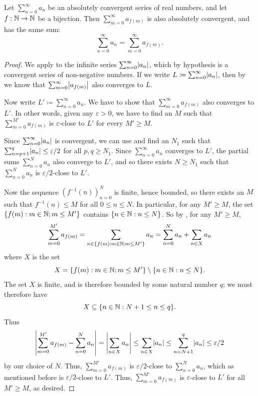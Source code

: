 \setcounter{thm}{2}
\begin{prop}\label{i:7.4.3}
  Let \(\sum_{n = 0}^\infty a_n\) be an absolutely convergent series of real numbers, and let \(f : \mathbb{N} \to \mathbb{N}\) be a bijection.
  Then \(\sum_{m = 0}^\infty a_{f(m)}\) is also absolutely convergent, and has the same sum:
  \[
    \sum_{n = 0}^\infty a_n = \sum_{m = 0}^\infty a_{f(m)}.
  \]
\end{prop}

\begin{proof}
  We apply  to the infinite series \(\sum_{n = 0}^\infty \abs{a_n}\), which by hypothesis is a convergent series of non-negative numbers.
  If we write \(L \coloneqq \sum_{n = 0}^\infty \abs{a_n}\), then by  we know that \(\sum_{m = 0}^\infty \abs{a_{f(m)}}\) also converges to \(L\).

  Now write \(L' \coloneqq \sum_{n = 0}^\infty a_n\).
  We have to show that \(\sum_{m = 0}^\infty a_{f(m)}\) also converges to \(L'\).
  In other words, given any \(\varepsilon > 0\), we have to find an \(M\) such that \(\sum_{m = 0}^{M'} a_{f(m)}\) is \(\varepsilon\)-close to \(L'\) for every \(M' \geq M\).

  Since \(\sum_{n = 0}^\infty \abs{a_n}\) is convergent, we can use  and find an \(N_1\) such that \(\sum_{n = p + 1}^q \abs{a_n} \leq \varepsilon / 2\) for all \(p, q \geq N_1\).
  Since \(\sum_{n = 0}^\infty a_n\) converges to \(L'\), the partial sums \(\sum_{n = 0}^N a_n\) also converge to \(L'\), and so there exists \(N \geq N_1\) such that \(\sum_{n = 0}^N a_n\) is \(\varepsilon / 2\)-close to \(L'\).

  Now the sequence \((f^{-1}(n))_{n = 0}^N\) is finite, hence bounded, so there exists an \(M\) such that \(f^{-1}(n) \leq M\) for all \(0 \leq n \leq N\).
  In particular, for any \(M' \geq M\), the set \(\left\lbrace f(m) : m \in \mathbb{N}; m \leq M'\right\rbrace\) contains \(\left\lbrace n \in \mathbb{N} : n \leq N\right\rbrace\).
  So by , for any \(M' \geq M\),
  \[
    \sum_{m = 0}^{M'} a_{f(m)} = \sum_{n \in \left\lbrace f(m) : m \in \mathbb{N}; m \leq M'\right\rbrace} a_n = \sum_{n = 0}^N a_n + \sum_{n \in X} a_n
  \]
  where \(X\) is the set
  \[
    X = \set{f(m) : m \in \N; m \leq M'} \setminus \set{n \in \N : n \leq N}.
  \]
  The set \(X\) is finite, and is therefore bounded by some natural number \(q\);
  we must therefore have
  \[
    X \subseteq \set{n \in \N : N + 1 \leq n \leq q}.
  \]
  Thus
  \[
    \abs{\sum_{m = 0}^{M'} a_{f(m)} - \sum_{n = 0}^N a_n} = \abs{\sum_{n \in X} a_n} \leq \sum_{n \in X} \abs{a_n} \leq \sum_{n = N + 1}^q \abs{a_n} \leq \varepsilon / 2
  \]
  by our choice of \(N\).
  Thus, \(\sum_{m = 0}^{M'} a_{f(m)}\) is \(\varepsilon / 2\)-close to \(\sum_{n = 0}^N a_n\), which as mentioned before is \(\varepsilon / 2\)-close to \(L'\).
  Thus, \(\sum_{m = 0}^{M'} a_{f(m)}\) is \(\varepsilon\)-close to \(L'\) for all \(M' \geq M\), as desired.
\end{proof}

